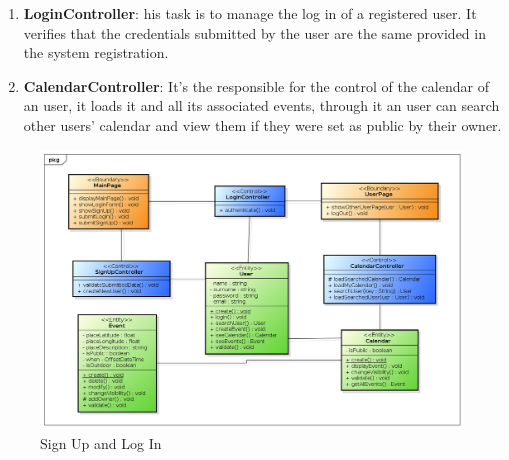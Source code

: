 \begin{itemize}
\begin{enumerate}
\item {\bf LoginController}: his task is to manage the log in of a registered user. It verifies that the credentials submitted by the user are the same provided in the system registration.  
\item {\bf CalendarController}: It's the responsible for the control of the calendar of an user, it loads it and all its associated events, through it an user can search other users' calendar and view them if they were set as public by their owner.
\end{enumerate}
\begin{center}
 \begin{figure}[H]
    \includegraphics[width=1\textwidth]{../BCEDiagram/BCE/EntityOverview/LoginBCE.png}
    \caption{Sign Up and Log In}
     \label{fig:logBCE}
     \end{figure}
   \end{center}  
\end{itemize}

